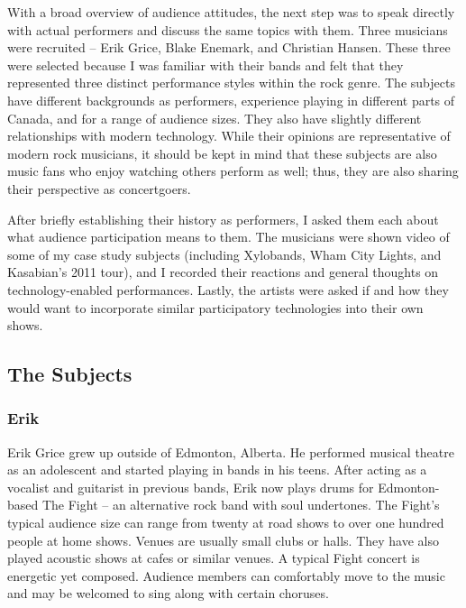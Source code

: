 With a broad overview of audience attitudes, the next step was to speak directly with actual performers and discuss the same topics with them. Three musicians were recruited -- Erik Grice, Blake Enemark, and Christian Hansen. These three were selected because I was familiar with their bands and felt that they represented three distinct performance styles within the rock genre. The subjects have different backgrounds as performers, experience playing in different parts of Canada, and for a range of audience sizes. They also have slightly different relationships with modern technology. While their opinions are representative of modern rock musicians, it should be kept in mind that these subjects are also music fans who enjoy watching others perform as well; thus, they are also sharing their perspective as concertgoers.

After briefly establishing their history as performers, I asked them each about what audience participation means to them. The musicians were shown video of some of my case study subjects (including Xylobands, Wham City Lights, and Kasabian's 2011 tour), and I recorded their reactions and general thoughts on technology-enabled performances. Lastly, the artists were asked if and how they would want to incorporate similar participatory technologies into their own shows.

\subsection{The Subjects}

\subsubsection{Erik}
Erik Grice grew up outside of Edmonton, Alberta. He performed musical theatre as an adolescent and started playing in bands in his teens. After acting as a vocalist and guitarist in previous bands, Erik now plays drums for Edmonton-based The Fight -- an alternative rock band with soul undertones. The Fight's typical audience size can range from twenty at road shows to over one hundred people at home shows. Venues are usually small clubs or halls. They have also played acoustic shows at cafes or similar venues. A typical Fight concert is energetic yet composed. Audience members can comfortably move to the music and may be welcomed to sing along with certain choruses.

